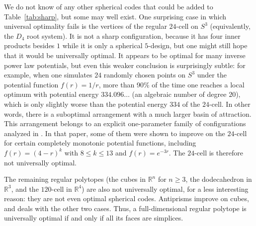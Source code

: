 \documentclass{jams-l}
\theoremstyle{plain}
\numberwithin{theorem}{section}
\theoremstyle{definition}
\numberwithin{equation}{section}
\newcommand{\R}{{\mathbb R}}
\begin{document}
We do not know of any other spherical codes that could be added to
Table~\ref{tab:sharp}, but some may well exist.  One surprising
case in which universal optimality fails is the vertices of the
regular $24$-cell on $S^3$ (equivalently, the $D_4$ root system).
It is not a sharp configuration, because it has four inner
products besides $1$ while it is only a spherical $5$-design, but
one might still hope that it would be universally optimal. It
appears to be optimal for many inverse power law potentials, but
even this weaker conclusion is surprisingly subtle: for example,
when one simulates $24$ randomly chosen points on $S^3$ under the
potential function $f(r)=1/r$, more than 90\% of the time one
reaches a local optimum with potential energy $334.096\dots$ (an
algebraic number of degree $20$),
which is only slightly worse than the potential energy $334$ of
the $24$-cell. In other words, there is a suboptimal arrangement
with a much larger basin of attraction.  This arrangement belongs
to an explicit one-parameter family of configurations analyzed in
\cite{CCEK}.  In that paper, some of them were shown to improve on
the $24$-cell for certain completely monotonic potential
functions, including $f(r) = (4-r)^k$ with $8 \le k \le 13$ and
$f(r) = e^{-3r}$. The $24$-cell is therefore not universally
optimal.

The remaining regular polytopes (the cubes in $\R^n$ for $n \ge
3$, the dodecahedron in $\R^3$, and the $120$-cell in $\R^4$) are
also not universally optimal, for a less interesting reason: they
are not even optimal spherical codes. Antiprisms improve on cubes,
and \cite{Sl} deals with the other two cases. Thus, a
full-dimensional regular polytope is universally optimal if and
only if all its faces are simplices.
\end{document}
